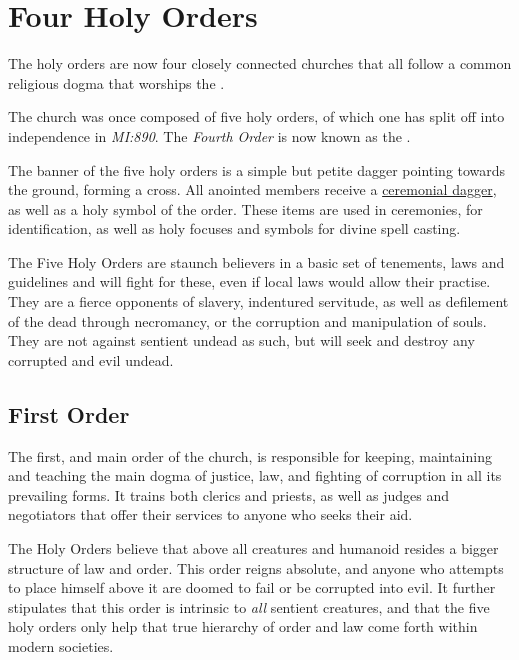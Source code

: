 \section{Four Holy Orders}
\label{sec:Four Holy Orders}

The holy orders are now four closely connected churches that all follow a
common religious dogma that worships the .

The church was once composed of five holy orders, of which one has split off
into independence in \emph{MI:890}. The \emph{Fourth Order} is now known
as the .

The banner of the five holy orders is a simple but petite dagger pointing
towards the ground, forming a cross. All anointed members receive a
\hyperref[sec:Dagger of the Order]{ceremonial dagger}, as well as a holy
symbol of the order. These items are used in ceremonies, for identification,
as well as holy focuses and symbols for divine spell casting.

The Five Holy Orders are staunch believers in a basic set of tenements, laws
and guidelines and will fight for these, even if local laws would allow their
practise. They are a fierce opponents of slavery, indentured servitude, as
well as defilement of the dead through necromancy, or the corruption and
manipulation of souls. They are not against sentient undead as such, but will
seek and destroy any corrupted and evil undead.

\subsection{First Order}
\label{sec:First Order}

The first, and main order of the church, is responsible for keeping, maintaining
and teaching the main dogma of justice, law, and fighting of corruption in all
its prevailing forms. It trains both clerics and priests, as well as judges and
negotiators that offer their services to anyone who seeks their aid.

The Holy Orders believe that above all creatures and humanoid resides a bigger
structure of law and order. This order reigns absolute, and anyone who attempts
to place himself above it are doomed to fail or be corrupted into evil. It
further stipulates that this order is intrinsic to \emph{all} sentient
creatures, and that the five holy orders only help that true hierarchy of order
and law come forth within modern societies.

